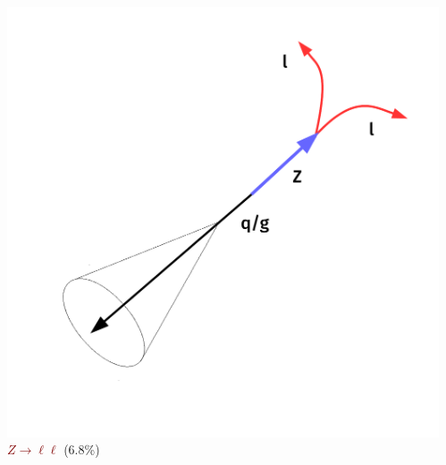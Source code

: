 \documentclass[aspectratio=169,xcolor=dvipsnames,,table,compress]{beamer}
\begin{document}
\begin{frame}[t]
\begin{columns}
\begin{column}{0.34\textwidth}
  \end{column}
  \begin{column}{0.33\textwidth}
    \centering
    \includegraphics[width=\textwidth]{../figures/talk/zcr.pdf} \\ \vspace{-7mm}
    \textcolor{maroon}{$Z\rightarrow\ell\ell$} (6.8\%) \\
  \end{column}
  \end{columns}
\end{frame}
\end{document}
